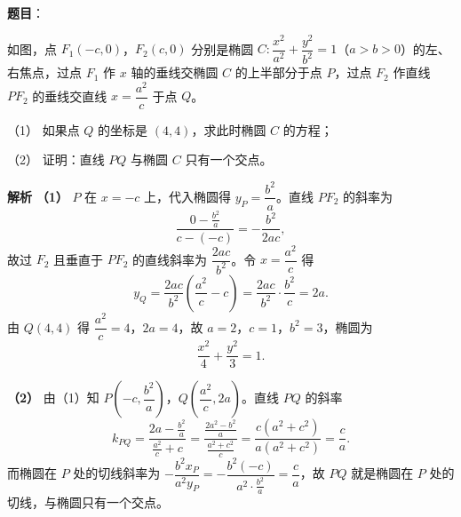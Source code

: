 \begin{answer}

\textbf{题目}：

如图，点 $F_1(-c,0)$，$F_2(c,0)$ 分别是椭圆 $C:\dfrac{x^2}{a^2}+\dfrac{y^2}{b^2}=1$（$a>b>0$）的左、右焦点，过点 $F_1$ 作 $x$ 轴的垂线交椭圆 $C$ 的上半部分于点 $P$，过点 $F_2$ 作直线 $PF_2$ 的垂线交直线 $x=\dfrac{a^2}c$ 于点 $Q$。

（1） 如果点 $Q$ 的坐标是 $(4,4)$，求此时椭圆 $C$ 的方程；

（2） 证明：直线 $PQ$ 与椭圆 $C$ 只有一个交点。
\nopagebreak[4]
\begin{center}\end{center}
\nopagebreak[4]
\textbf{解析}
\textbf{（1）} $P$ 在 $x=-c$ 上，代入椭圆得 $y_P=\dfrac{b^2}a$。直线 $PF_2$ 的斜率为
\nopagebreak[4]
\[\frac{0-\frac{b^2}a}{c-(-c)}=-\frac{b^2}{2ac},\]
故过 $F_2$ 且垂直于 $PF_2$ 的直线斜率为 $\dfrac{2ac}{b^2}$。令 $x=\dfrac{a^2}c$ 得
\nopagebreak[4]
\[y_Q=\frac{2ac}{b^2}\left(\frac{a^2}c-c\right)=\frac{2ac}{b^2}\cdot\frac{b^2}c=2a.\]
由 $Q(4,4)$ 得 $\dfrac{a^2}c=4$，$2a=4$，故 $a=2$，$c=1$，$b^2=3$，椭圆为
\nopagebreak[4]
\[\frac{x^2}4+\frac{y^2}3=1.\]

\textbf{（2）} 由（1）知 $P\left(-c,\dfrac{b^2}a\right)$，$Q\left(\dfrac{a^2}c,2a\right)$。直线 $PQ$ 的斜率
\nopagebreak[4]
\[k_{PQ}=\frac{2a-\frac{b^2}a}{\frac{a^2}c+c}=\frac{\frac{2a^2-b^2}a}{\frac{a^2+c^2}c}=\frac{c(a^2+c^2)}{a(a^2+c^2)}=\frac ca.\]
而椭圆在 $P$ 处的切线斜率为 $-\dfrac{b^2x_P}{a^2y_P}=-\dfrac{b^2(-c)}{a^2\cdot\frac{b^2}a}=\dfrac ca$，故 $PQ$ 就是椭圆在 $P$ 处的切线，与椭圆只有一个交点。



\end{answer}
